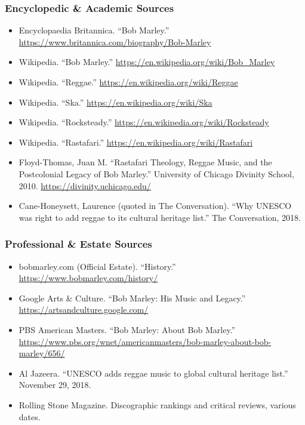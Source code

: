 \documentclass[11pt,letterpaper]{article}
\begin{document}
\subsubsection{Encyclopedic \& Academic Sources}
\begin{itemize}[noitemsep]
  \item Encyclopaedia Britannica. ``Bob Marley.'' \url{https://www.britannica.com/biography/Bob-Marley}
  \item Wikipedia. ``Bob Marley.'' \url{https://en.wikipedia.org/wiki/Bob_Marley}
  \item Wikipedia. ``Reggae.'' \url{https://en.wikipedia.org/wiki/Reggae}
  \item Wikipedia. ``Ska.'' \url{https://en.wikipedia.org/wiki/Ska}
  \item Wikipedia. ``Rocksteady.'' \url{https://en.wikipedia.org/wiki/Rocksteady}
  \item Wikipedia. ``Rastafari.'' \url{https://en.wikipedia.org/wiki/Rastafari}
  \item Floyd-Thomas, Juan M. ``Rastafari Theology, Reggae Music, and the Postcolonial Legacy of Bob Marley.'' University of Chicago Divinity School, 2010. \url{https://divinity.uchicago.edu/}
  \item Cane-Honeysett, Laurence (quoted in The Conversation). ``Why UNESCO was right to add reggae to its cultural heritage list.'' The Conversation, 2018.
\end{itemize}

\subsubsection{Professional \& Estate Sources}
\begin{itemize}[noitemsep]
  \item bobmarley.com (Official Estate). ``History.'' \url{https://www.bobmarley.com/history/}
  \item Google Arts \& Culture. ``Bob Marley: His Music and Legacy.'' \url{https://artsandculture.google.com/}
  \item PBS American Masters. ``Bob Marley: About Bob Marley.'' \url{https://www.pbs.org/wnet/americanmasters/bob-marley-about-bob-marley/656/}
  \item Al Jazeera. ``UNESCO adds reggae music to global cultural heritage list.'' November 29, 2018.
  \item Rolling Stone Magazine. Discographic rankings and critical reviews, various dates.
\end{itemize}
\end{document}

